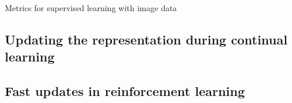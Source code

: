 \documentclass{article}
\newlength{\tblw}
\begin{document}
\begin{table}[t!] 
  \centering\scriptsize
  \caption{Metrics for supervised learning with image data} 
	\label{tbl:imagesuper}
	\renewcommand{\arraystretch}{1.}
	\setlength{\tabcolsep}{6pt}
	\setlength{\tblw}{0.2\textwidth}  
	
	\newcommand{\val}[2]{%
		$#1$\textcolor{gray}{\tiny ${\pm}#2$}
	} 

	
\end{table}
\subsection{Updating the representation during continual learning}

\begin{table}[t!] 
  \centering\scriptsize
  \caption{
  TODO: CL Experiments. $^*$ Methods relying only on weight regularization. 
  }
	\label{tbl:cl_table_1}
	\renewcommand{\arraystretch}{1.}
	\setlength{\tabcolsep}{2pt}
	\setlength{\tblw}{0.14\textwidth}  
	
	\newcommand{\val}[2]{%
		$#1$\textcolor{gray}{\tiny ${\pm}#2$}
	} 
	
	
\end{table}


\subsection{Fast updates in reinforcement learning}
\end{document}

